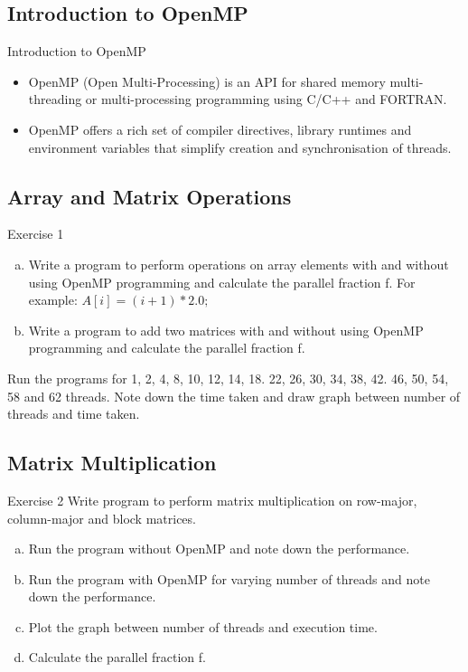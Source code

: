 \documentclass{beamer}
\begin{document}
		\subsection{Introduction to OpenMP}
			\begin{frame}{Introduction to OpenMP}
				\begin{itemize}
					\item OpenMP (Open Multi-Processing) is an API for shared memory multi-threading or multi-processing programming using C/C++ and FORTRAN.
					\linebreak
					\item OpenMP offers a rich set of compiler directives, library runtimes and environment variables that simplify creation and synchronisation of threads.
				\end{itemize}
			\end{frame}	
			
		\subsection{Array and Matrix Operations}
			\begin{frame}{Exercise 1}
				\begin{enumerate}[(a)]
					\item Write a program to perform operations on array elements with and without using OpenMP programming and calculate the parallel fraction f. For example: $A[i] = (i+1)*2.0;$
					\linebreak
					\item Write a program to add two matrices with and without using OpenMP programming and calculate the parallel fraction f.
				\end{enumerate}
				
				\begin{block}{}
					\small
					Run the programs for 1, 2, 4, 8, 10, 12, 14, 18. 22, 26, 30, 34, 38, 42. 46, 50, 54, 58 and 62 threads. Note down the time taken and draw graph between number of threads and time taken.
				\end{block}
			\end{frame}
			
		\subsection{Matrix Multiplication}
			\begin{frame}{Exercise 2}
				Write program to perform matrix multiplication on row-major, column-major and block matrices.

				\begin{enumerate}[(a)]
					\item Run the program without OpenMP and note down the performance.
					\item Run the program with OpenMP for varying number of threads and note down the performance.
					\item Plot the graph between number of threads and execution time.
					\item Calculate the parallel fraction f.
				\end{enumerate}
			\end{frame}
		
\end{document}
